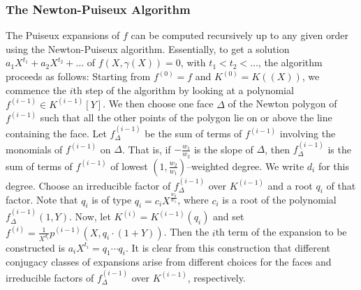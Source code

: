 \documentclass[a4paper,11pt]{amsart}%
\theoremstyle{definition}
\theoremstyle{plain}
\theoremstyle{remark}
\begin{document}
\subsubsection*{The Newton-Puiseux Algorithm}

The Puiseux expansions of $f$ can be computed recursively up to any given
order using the Newton-Puiseux algorithm. Essentially, to get a solution
$a_{1}X^{t_{1}}+a_{2}X^{t_{2}}+\dots$ of $f(X, \gamma(X))=0$, with
$t_{1}<t_{2}<\dots$, the algorithm proceeds as follows: Starting from $f^{(0)}
= f$ and $K^{(0)} = K((X))$, we commence the $i$th step of the algorithm by
looking at a polynomial $f^{(i-1)}\in K^{(i-1)} [Y]$. We then choose one face
$\Delta$ of the Newton polygon of $f^{(i-1)}$ such that all the other points
of the polygon lie on or above the line containing the face. Let
$f^{(i-1)}_{\Delta}$ be the sum of terms of $f^{(i-1)}$ involving the
monomials of $f^{(i-1)}$ on $\Delta$. That is, if $-\frac{w_{1}}{w_{2}}$ is
the slope of $\Delta$, then $f^{(i-1)}_{\Delta}$ is the sum of terms of
$f^{(i-1)}$ of lowest $(1,\frac{w_{2}}{w_{1}})$--weighted degree. We write
$d_{i}$ for this degree. Choose an irreducible factor of $f^{(i-1)}_{\Delta}$
over $K^{(i-1)}$ and a root $q_{i}$ of that factor. Note that $q_{i}$ is of
type $q_{i}=c_{i}X^{\frac{w_{2}}{w_{1}}}$, where $c_{i}$ is a root of the
polynomial $f^{(i-1)}_{\Delta}(1,Y)$. Now, let $K^{(i)} = K^{(i-1)}(q_{i})$
and set $f^{(i)} = \frac{1}{X^{d_{i}}}p^{(i-1)}(X, q_{i}\cdot(1+Y))$. Then the
$i$th term of the expansion to be constructed is $a_{i}X^{t_{i}} = q_{1}\cdots
q_{i}$.  It is clear from this construction that
different conjugacy classes of expansions arise from different choices for the
faces and irreducible factors of $f^{(i-1)}_{\Delta}$ over $K^{(i-1)}$, respectively.
\end{document}
